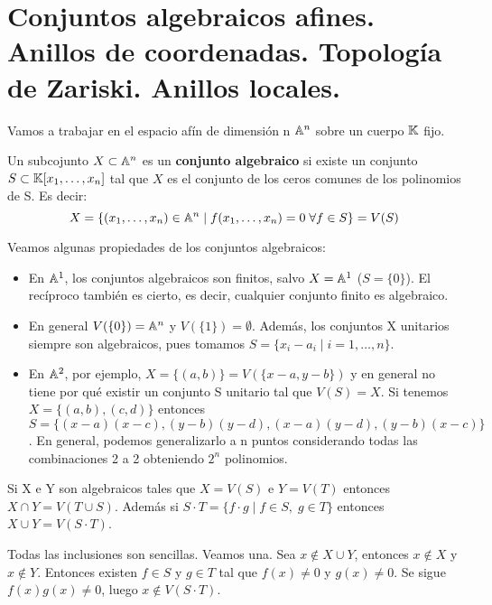 \documentclass[ACGA.tex]{subfiles}
\begin{document}
\chapter{Conjuntos algebraicos afines. Anillos de coordenadas. Topología de Zariski. Anillos locales.}
Vamos a trabajar en el espacio afín de dimensión n $\mathbb{A}^n$ sobre un cuerpo $\mathbb{K}$ fijo. 
\begin{defi}
Un subcojunto $X\subset \mathbb{A}^n$ es un \textbf{conjunto algebraico} si existe un conjunto $S\subset \mathbb{K}[x_1,\dotsc,x_n]$ tal que $X$ es el conjunto de los ceros comunes de los polinomios de S. Es decir:
\[
X=\{(x_1,\dotsc,x_n)\in\mathbb{A}^n\mid f(x_1,\dotsc,x_n)=0\;\forall f\in S\}=V(S)
\]
\end{defi}
\begin{prop}Veamos algunas propiedades de los conjuntos algebraicos:
\begin{itemize}
\item En $\mathbb{A}^1$, los conjuntos algebraicos son finitos, salvo $X=\mathbb{A}^1$ ($S=\{0\}$). El recíproco también es cierto, es decir, cualquier conjunto finito es algebraico.
\item En general $V(\{0\})=\mathbb{A}^n$ y $V(\{1\})=\emptyset$. Además, los conjuntos X unitarios siempre son algebraicos, pues tomamos $S=\{x_i-a_i\mid i=1,\dotsc,n\}$.
\item En $\mathbb{A}^2$, por ejemplo, $X=\{(a,b)\} = V(\{x-a,y-b\})$ y en general no tiene por qué existir un conjunto S unitario tal que $V(S)=X$. Si tenemos $X=\{(a,b),(c,d)\}$ entonces $S=\{(x-a)(x-c),(y-b)(y-d), (x-a)(y-d), (y-b)(x-c)\}$. En general, podemos generalizarlo a n puntos considerando todas las combinaciones 2 a 2 obteniendo $2^n$ polinomios.
\end{itemize}
\end{prop}
\begin{prop}
Si X e Y son algebraicos tales que $X=V(S)$ e $Y=V(T)$ entonces $X\cap Y = V(T\cup S)$. Además si $S\cdot T = \{f\cdot g \mid f \in S,\; g \in T\}$ entonces $X\cup Y = V(S\cdot T)$. 
\end{prop}
\begin{dem}
Todas las inclusiones son sencillas. Veamos una. Sea $x\notin X\cup Y$, entonces $x\notin X$ y $x\notin Y$. Entonces existen $f\in S$ y $g\in T$ tal que $f(x)\neq 0$ y $g(x)\neq 0$. Se sigue $f(x)g(x)\neq 0$, luego $x\notin V(S\cdot T)$. 
\end{dem}
\end{document}
